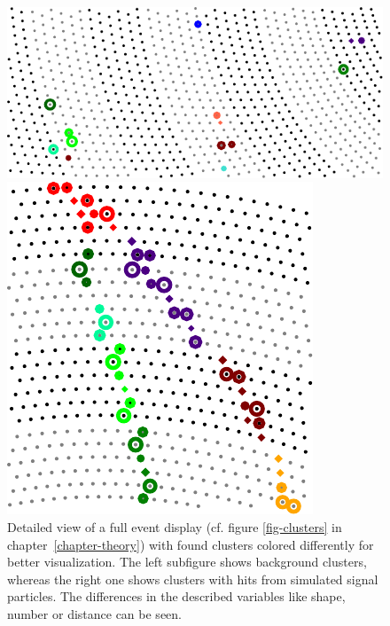\begin{figure}
  \centering
  \begin{minipage}{0.58\linewidth}
    \centering
    \includegraphics[scale=0.8]{figures/workflow/cluster_display_background.pdf}
  \end{minipage}
  \begin{minipage}{0.4\linewidth}
    \centering
    \includegraphics[scale=0.8]{figures/workflow/cluster_display_signal.pdf}
  \end{minipage}
  \caption{Detailed view of a full event display (cf. figure \ref{fig-clusters} in chapter~\ref{chapter-theory}) with found clusters colored differently for better visualization. The left subfigure shows background clusters, whereas the right one shows clusters with hits from simulated signal particles. The differences in the described variables like shape, number or distance can be seen.}
  \label{fig-cluster-versus}
\end{figure}


